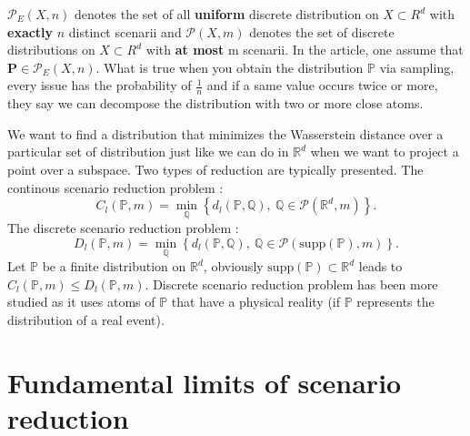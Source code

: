 \documentclass{amsart}
\newcommand{\RR}{\mathbb{R}}
\begin{document}
$\mathcal{P}_E(X,n)$ denotes the set of all \textbf{uniform} discrete distribution on $X\subset R^d$ with \textbf{exactly} $n$ distinct scenarii and $\mathcal{P}(X,m)$ denotes the set of discrete distributions on $X\subset R^d$ with \textbf{at most} m scenarii. In the article, one assume that $\mathbf{P}\in\mathcal{P}_E(X,n)$. What is true when you obtain the distribution $\mathbb{P}$ via sampling, every issue has the probability of $\frac{1}{n}$ and if a same value occurs twice or more, they say we can decompose the distribution with two or more close atoms.
\newline

We want to find a distribution that minimizes the Wasserstein distance over a particular set of distribution just like we can do in $\RR^d$ when we want to project a point over a subspace. Two types of reduction are typically presented. The continous scenario reduction problem :
$$
C_l(\mathbb{P},m)=\min_\mathbb{Q}\left\{d_l(\mathbb{P},\mathbb{Q}),\: \mathbb{Q}\in\mathcal{P}(\mathbb{R}^d,m)\right\}. 
$$
The discrete scenario reduction problem :
$$
D_l(\mathbb{P},m)=\min_\mathbb{Q}\left\{d_l(\mathbb{P},\mathbb{Q}),\: \mathbb{Q}\in\mathcal{P}(\text{supp}(\mathbb{P}),m)\right\}.
$$
Let $\mathbb{P}$ be a finite distribution on $\RR^d$, obviously $\text{supp}(\mathbb{P})\subset \mathbb{R}^d$ leads to $C_l(\mathbb{P},m)\leq D_l(\mathbb{P},m)$. Discrete scenario reduction problem has been more studied as it uses atoms of $\mathbb{P}$ that have a physical reality (if $\mathbb{P}$ represents the distribution of a real event).

\section{Fundamental limits of scenario reduction}\label{limit}
\end{document}

